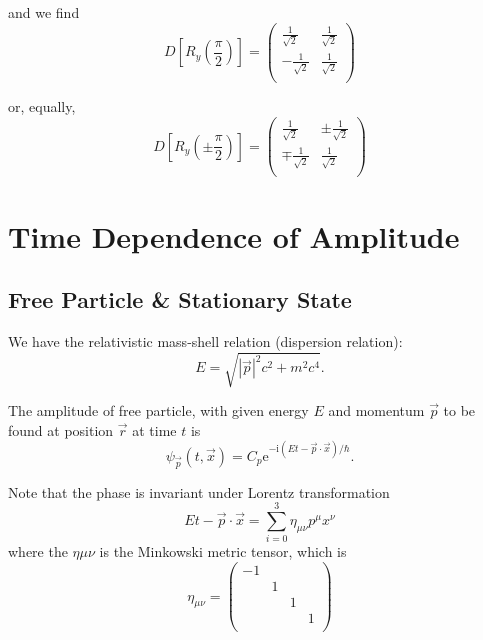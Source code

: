 
and we find
\begin{equation}
  D\left[ R_y \left( \frac{\pi}{2} \right)  \right] = \begin{pmatrix}
   \frac{1}{\sqrt{2}} & \frac{1}{\sqrt{2}}\\
   -\frac{1}{\sqrt{2}} & \frac{1}{\sqrt{2}}\\
  \end{pmatrix}
\end{equation}

or, equally,
\begin{equation}
  D \left[ R_y \left( \pm \frac{\pi}{2} \right)  \right] = \begin{pmatrix}
    \frac{1}{\sqrt{2}} & \pm \frac{1}{\sqrt{2}}\\
    \mp \frac{1}{\sqrt{2}} & \frac{1}{\sqrt{2}}\\
   \end{pmatrix}
\end{equation}

\chapter[概率幅的时间依赖]{Time Dependence of Amplitude}
\section[自由粒子,定态]{Free Particle \& Stationary State}
We have the relativistic mass-shell relation (dispersion relation):
\begin{equation}
  E = \sqrt{\left| \vec{p} \right| ^{2} c^{2} + m^{2} c^{4}}.
\end{equation}

The amplitude of free particle, with given energy $E$ and momentum $\vec{p}$ to be found at position $\vec{r}$ at time $t$ is
\begin{equation}
    \psi_{\vec{p}} \left( t, \vec{x} \right)  = C_{p} \mathrm{e}^{- \mathrm{i} \left( Et - \vec{p}\cdot \vec{x} \right) / \hbar }.
\end{equation}

Note that the phase is invariant under Lorentz transformation
\begin{equation}
  Et - \vec{p}\cdot \vec{x} = \sum_{i=0}^{3} \eta_{\mu\nu}p^{\mu} x^{\nu}
\end{equation}
where the $\eta\mu\nu$ is the Minkowski metric tensor, which is
\begin{equation}
    \eta_{\mu\nu} = \begin{pmatrix}
        -1 & & & \\
         & 1 & & \\
         & & 1 & \\
         & & & 1 \\
    \end{pmatrix}
\end{equation}

